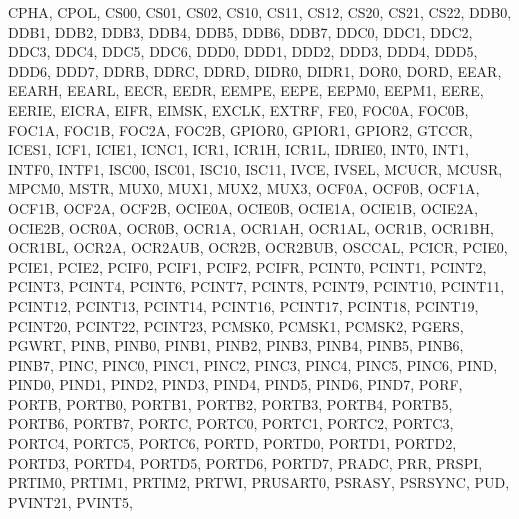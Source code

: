 {{                CPHA, CPOL, CS00, CS01, CS02, CS10, CS11, CS12, 
                CS20, CS21, CS22, 
                DDB0, DDB1, DDB2, DDB3, DDB4, DDB5, DDB6, DDB7, 
                DDC0, DDC1, DDC2, DDC3, DDC4, DDC5, DDC6, 
                DDD0, DDD1, DDD2, DDD3, DDD4, DDD5, DDD6, DDD7, 
                DDRB, DDRC, DDRD, DIDR0, DIDR1, DOR0, DORD, 
                EEAR, EEARH, EEARL, EECR, EEDR, EEMPE, EEPE, 
                EEPM0, EEPM1, EERE, EERIE, EICRA, EIFR, EIMSK, 
                EXCLK, EXTRF, FE0, 
                FOC0A, FOC0B, FOC1A, FOC1B, FOC2A, FOC2B, 
                GPIOR0, GPIOR1, GPIOR2, GTCCR, 
                ICES1, ICF1, ICIE1, ICNC1, ICR1, ICR1H, ICR1L, 
                IDRIE0, INT0, INT1, INTF0, INTF1, ISC00, ISC01, 
                ISC10, ISC11, IVCE, IVSEL, 
                MCUCR, MCUSR, MPCM0, MSTR, MUX0, MUX1, MUX2, 
                MUX3, 
                OCF0A, OCF0B, OCF1A, OCF1B, OCF2A, OCF2B, 
                OCIE0A, OCIE0B, OCIE1A, OCIE1B, OCIE2A, OCIE2B,
                OCR0A, OCR0B, OCR1A, OCR1AH, OCR1AL, OCR1B, 
                OCR1BH, OCR1BL, OCR2A, OCR2AUB, OCR2B, OCR2BUB,
                OSCCAL, 
                PCICR, PCIE0, PCIE1, PCIE2, PCIF0, PCIF1, 
                PCIF2, PCIFR, 
                PCINT0, PCINT1, PCINT2, PCINT3, PCINT4, PCINT6,
                PCINT7, PCINT8, PCINT9, PCINT10, PCINT11, 
                PCINT12, PCINT13, PCINT14, PCINT16, PCINT17, 
                PCINT18, PCINT19, PCINT20, PCINT22, PCINT23, 
                PCMSK0, PCMSK1, PCMSK2, PGERS, PGWRT, 
                PINB, 
                PINB0, PINB1, PINB2, PINB3, PINB4, PINB5, PINB6,
                PINB7, 
                PINC, 
                PINC0, PINC1, PINC2, PINC3, PINC4, PINC5, PINC6,  
                PIND, 
                PIND0, PIND1, PIND2, PIND3, PIND4, PIND5, PIND6,
                PIND7, 
                PORF, 
                PORTB, 
                PORTB0, PORTB1, PORTB2, PORTB3, PORTB4, PORTB5,
                PORTB6, PORTB7, 
                PORTC, 
                PORTC0, PORTC1, PORTC2, PORTC3, PORTC4, PORTC5,
                PORTC6, 
                PORTD, 
                PORTD0, PORTD1, PORTD2, PORTD3, PORTD4, PORTD5,
                PORTD6, PORTD7, 
                PRADC, PRR, PRSPI, PRTIM0, PRTIM1, PRTIM2, 
                PRTWI, PRUSART0, PSRASY, PSRSYNC, PUD, PVINT21,
                PVINT5, 
}}
